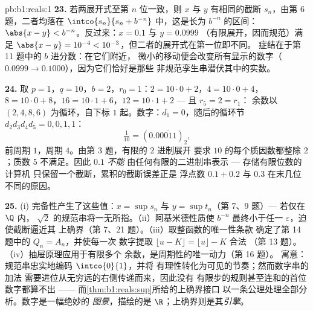 \begin{solution}{pb:b1:reals:1}
\textbf{23.} 若两展开式至第 $n$ 位一致，则 $x$ 与 $y$
有相同的截断 $s_n$，由第 6 题，二者均落在
$\intco{s_n}{s_n + b^{-n}}$ 中，这是长为 $b^{-n}$ 的区间：
$\abs{x - y} < b^{-n}$。反过来：$x = 0.1$ 与 $y = 0.0999$
（有限展开，因而规范）满足 $\abs{x - y} = 10^{-4} <
10^{-3}$，但二者的展开式在第一位即不同。
症结在于第 11 题中的 $b$ 进分数：在它们附近，
微小的移动便会改变所有显示的数字（$0.0999 \to
0.1000$），因为它们恰好是那些
非规范孪生串潜伏其中的实数。

\textbf{24.} 取 $p = 1$，$q = 10$，$b = 2$，$r_0 = 1$：$2 = 10 \cdot
0 + 2$，$4 = 10 \cdot 0 + 4$，$8 = 10 \cdot 0 + 8$，$16 = 10
\cdot 1 + 6$，$12 = 10 \cdot 1 + 2$ --- 且 $r_5 = 2 = r_1$：
余数以 $(2, 4, 8, 6)$ 为循环，自下标 $1$ 起。数字：$d_1 =
0$，随后的循环节 $d_2 d_3 d_4 d_5 = 0, 0, 1, 1$：
\[
\tfrac{1}{10} = (0.0\overline{0011})_2 ,
\]
前周期 $1$，周期 $4$。由第 3 题，有限的 $2$ 进制展开
要求 $10$ 的每个质因数都整除 $2$；质数
$5$ 不满足。因此 $0.1$ \emph{不能}
由任何有限的二进制串表示 --- 存储有限位数的计算机
只保留一个截断，累积的截断误差正是
浮点数 $0.1 + 0.2$ 与 $0.3$ 在末几位不同的原因。

\textbf{25.} (i) 完备性产生了这些值：$x = \sup s_n$
与 $y = \sup t_n$（第 7、9 题）--- 若仅在 $\Q$ 内，
$\sqrt 2$ 的规范串将一无所指。（ii）阿基米德性质使
$b^{-n}$ 最终小于任一
$\varepsilon$，迫使截断逼近其
上确界（第 7、21 题）。（iii）取整函数的唯一性条款
确定了第 14 题中的 $Q_n = A_n$，并使每一次
数字提取 $\lfloor u - K \rfloor = \lfloor u \rfloor - K$ 合法
（第 13 题）。（iv）抽屉原理应用于有限多个
余数，是周期性的唯一动力（第 16 题）。
寓意：规范串忠实地编码 $\intco{0}{1}$，并将
有理性转化为可见的节奏；然而数字串的加法
需要进位从无穷远的右侧传递而来，因此没有
有限步的规则甚至连和的首位数字都算不出 ——
而\cref{thm:b1:reals:sup}所给的上确界接口
以一条公理处理全部分析。数字是一幅绝妙的
\emph{图景}，描绘的是 $\R$；上确界则是其\emph{引擎}。
\end{solution}
